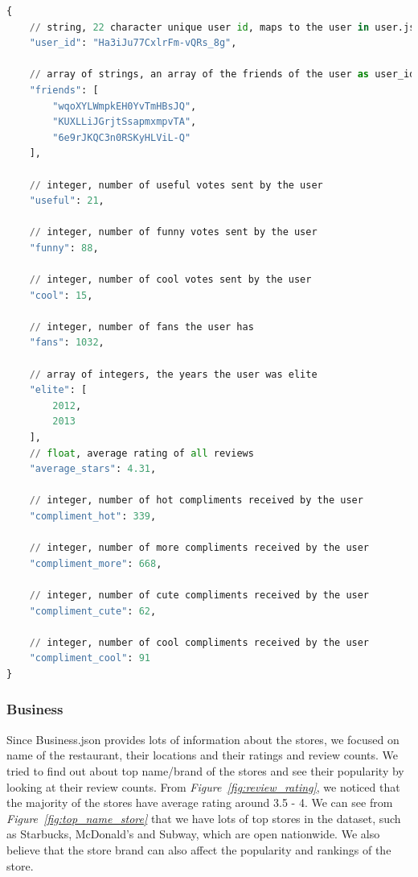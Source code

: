 \documentclass[journal]{IEEEtran}
\begin{document}
\begin{lstlisting}[language=Python, caption=Users Data Example]
{
    // string, 22 character unique user id, maps to the user in user.json
    "user_id": "Ha3iJu77CxlrFm-vQRs_8g",

    // array of strings, an array of the friends of the user as user_ids
    "friends": [
        "wqoXYLWmpkEH0YvTmHBsJQ",
        "KUXLLiJGrjtSsapmxmpvTA",
        "6e9rJKQC3n0RSKyHLViL-Q"
    ],

    // integer, number of useful votes sent by the user
    "useful": 21,

    // integer, number of funny votes sent by the user
    "funny": 88,

    // integer, number of cool votes sent by the user
    "cool": 15,

    // integer, number of fans the user has
    "fans": 1032,

    // array of integers, the years the user was elite
    "elite": [
        2012,
        2013
    ],
    // float, average rating of all reviews
    "average_stars": 4.31,

    // integer, number of hot compliments received by the user
    "compliment_hot": 339,

    // integer, number of more compliments received by the user
    "compliment_more": 668,

    // integer, number of cute compliments received by the user
    "compliment_cute": 62,

    // integer, number of cool compliments received by the user
    "compliment_cool": 91
}
\end{lstlisting}

\subsubsection{Business}

Since Business.json provides lots of information about the stores, we focused on name of the restaurant, their locations and their ratings and review counts. We tried to find out about top name/brand of the stores and see their popularity by looking at their review counts. From {\it Figure~\ref{fig:review_rating}}, we noticed that the majority of the stores have average rating around 3.5 - 4. We can see from {\it Figure~\ref{fig:top_name_store}} that we have lots of top stores in the dataset, such as Starbucks, McDonald's and Subway, which are open nationwide. We also believe that the store brand can also affect the popularity and rankings of the store.
\end{document}
